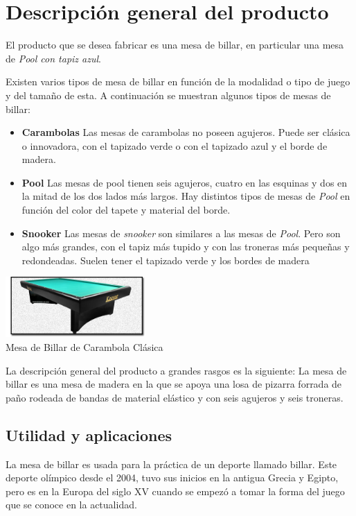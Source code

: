 \section {Descripción general del producto}
	El producto que se desea fabricar es una mesa de billar, en particular una mesa de \emph{Pool con tapiz azul}.

Existen varios tipos de mesa de billar en función de la modalidad o tipo de juego y del tamaño de esta. A continuación se muestran algunos tipos de mesas de billar:

\begin{itemize}
\item {\bf Carambolas}
 Las mesas de carambolas no poseen agujeros. Puede ser clásica o innovadora, con el tapizado verde o  con el tapizado azul y el borde de madera.
\item {\bf Pool} 
Las mesas de pool tienen seis agujeros, cuatro en las esquinas y dos en la mitad de los dos lados más largos. Hay distintos tipos de mesas de \emph{Pool} en función del color del tapete y material del borde.
\item {\bf Snooker}
Las mesas de \emph{snooker} son similares a las mesas de \emph{Pool}. Pero son algo más grandes, con el tapiz más tupido y con las troneras más pequeñas y redondeadas. Suelen tener el tapizado verde y los bordes de madera
\end{itemize}

	  \begin{center}
    			\includegraphics[width=0.4\textwidth]{PiramidCaram.jpg} \\
 \small { Mesa de Billar de Carambola  Clásica}
		\end{center}

La descripción general del producto a grandes rasgos es la siguiente: La mesa de billar es una mesa de madera en la que se apoya una losa de pizarra forrada de paño rodeada de bandas de material elástico y con seis agujeros y seis troneras. 
	
	\subsection {Utilidad y aplicaciones}
	La mesa de billar es usada para la práctica de un deporte llamado billar. Este deporte olímpico desde el 2004, tuvo sus inicios en la 
 antigua  Grecia y Egipto, pero es en la Europa del siglo XV cuando se empezó a tomar la forma del juego que se conoce en la actualidad. 

